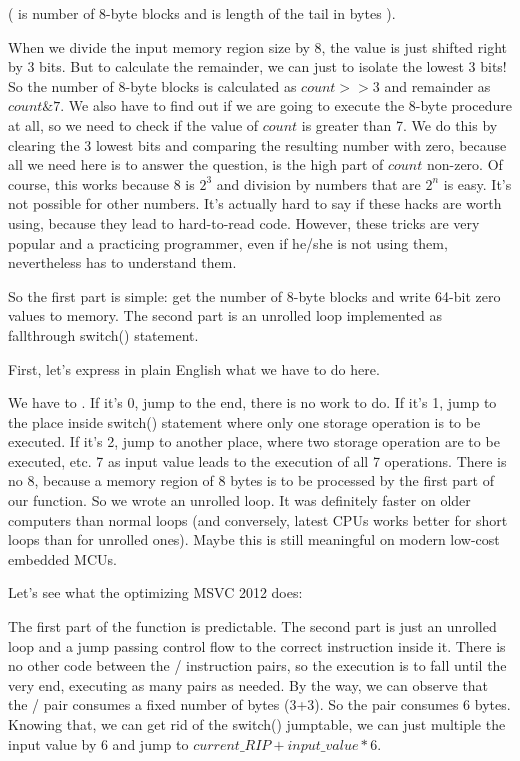 (  is number of 8-byte blocks and  is length of the tail in bytes ).

When we divide the input memory region size by 8, the value is just shifted right by 3 bits.
But to calculate the remainder, we can just to isolate the lowest 3 bits!
So the number of 8-byte blocks is calculated as $count>>3$ and remainder as $count \& 7$.
We also have to find out if we are going to execute the 8-byte procedure at all, so we need
to check if the value of $count$ is greater than 7.
We do this by clearing the 3 lowest bits and comparing the resulting number with zero, because 
all we need here is to answer the question, is the high part of $count$ non-zero.
Of course, this works because 8 is $2^{3}$ and division by numbers that are $2^n$ is easy.
It's not possible for other numbers.
It's actually hard to say if these hacks are worth using, because they lead
to hard-to-read code.
However, these tricks are very popular and a practicing programmer, 
even if he/she is not using them, nevertheless has to understand them.

So the first part is simple: get the number of 8-byte blocks and write 64-bit zero values to memory.
The second part is an unrolled loop implemented as fallthrough switch() statement.

First, let's express in plain English what we have to do here.

We have to .
If it's 0, jump to the end, there is no work to do.
If it's 1, jump to the place inside switch() statement where only one storage operation
is to be executed.
If it's 2, jump to another place, where two storage operation are to be executed, etc.
7 as input value leads to the execution of all 7 operations.
There is no 8, because a memory region of 8 bytes is to be processed by the first part of our function.
So we wrote an unrolled loop.
It was definitely faster on older computers than normal loops (and conversely,
latest \ac{CPU}s works better for short loops than for unrolled ones).
Maybe this is still meaningful on modern low-cost embedded \ac{MCU}s.

Let's see what the optimizing MSVC 2012 does:



The first part of the function is predictable.
The second part is just an unrolled loop and a jump passing control flow to the correct instruction
inside it.
There is no other code between the / instruction pairs, 
so the execution is to fall until the very end, executing as many pairs as needed.
By the way, we can observe that the / pair consumes a fixed number of bytes (3+3).
So the pair consumes 6 bytes.
Knowing that, we can get rid of the switch() jumptable, we can just multiple the input value by 6
and jump to $current\_RIP + input\_value * 6$.

